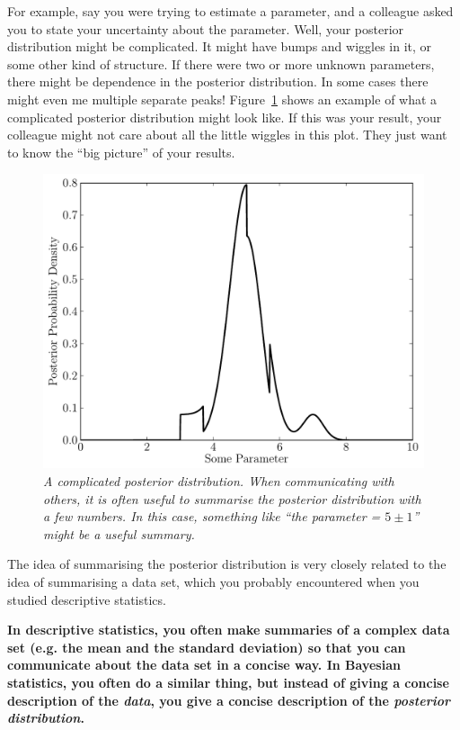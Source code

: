 For example, say you were trying to estimate
a parameter, and a colleague asked you to state your uncertainty about the
parameter. Well, your posterior distribution might be complicated. It might
have bumps and wiggles in it, or some other kind of structure. If there were
two or more unknown parameters, there might be dependence in the posterior
distribution. In some cases there might even me multiple separate peaks!
Figure~\ref{fig:complicated_posterior} shows an example of what a complicated
posterior distribution might look like. If this was your result, your colleague
might not care about all the little wiggles in this plot. They just want to know
the ``big picture'' of your results.
\begin{figure}[!ht]
\begin{center}
\includegraphics[scale=0.6]{Figures/complicated_posterior.pdf}
\caption{\it A complicated posterior distribution. When communicating with others,
it is often useful to summarise the posterior distribution with a few numbers. In
this case, something like ``the parameter = $5 \pm 1$'' might be a useful summary.
\label{fig:complicated_posterior}}
\end{center}
\end{figure}

The idea of summarising the posterior distribution is very closely related to
the idea of summarising a data set, which you probably encountered when you
studied descriptive statistics.
\begin{framed}
{\bf In descriptive statistics, you often make summaries of a complex data set
(e.g. the mean and the standard deviation) so that you can communicate about
the data set in a concise way. In Bayesian statistics, you often do a similar
thing, but instead of giving a concise description of the {\it data}, you give a
concise description of the {\it posterior distribution}.}
\end{framed}

